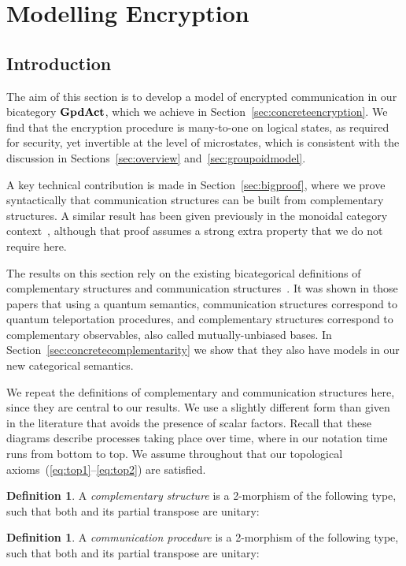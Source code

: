 \documentclass[a4paper,12pt]{article}
\theoremstyle{definition}
\newtheorem{defn}[theorem]{Definition}
\newcommand\cat[1]{{\ensuremath{\bf #1}}}
\renewcommand{\-}[0]{\nobreakdash-\hspace{0pt}}
\begin{document}
\section{Modelling Encryption}
\label{sec:encryption}

\subsection{Introduction}

\noindent
The aim of this section is to develop a model of encrypted communication in our bicategory \cat{GpdAct}, which we achieve in Section~\ref{sec:concreteencryption}. We find that the encryption procedure is many-to-one on logical states, as required for security, yet invertible at the level of microstates, which is consistent with the discussion in Sections~\ref{sec:overview} and~\ref{sec:groupoidmodel}.

A key technical  contribution is made in Section~\ref{sec:bigproof}, where we prove syntactically that communication structures can be built from complementary structures. A similar result has been given previously in the monoidal category context~\cite{cd11-iqo}, although that proof assumes a strong extra property that we do not require here.

The results on this section rely on the existing bicategorical definitions of complementary structures and communication structures~\cite{v12-hqt,v12-hsqp}. It was shown in those papers that using a quantum semantics, communication structures correspond to quantum teleportation procedures, and complementary structures correspond to complementary observables, also called mutually-unbiased bases. In Section~\ref{sec:concretecomplementarity} we show that they also have models in our new categorical semantics.

We repeat the definitions of complementary and communication structures here, since they are central to our results. We use a slightly different form than given in the literature that avoids the presence of scalar factors. Recall that these diagrams describe processes taking place over time, where in our notation time runs from bottom to top. We assume throughout that our topological axioms~(\ref{eq:top1}--\ref{eq:top2}) are satisfied.
\begin{defn}
\label{def:complementarystructure}
A \textit{complementary structure} is a 2\-morphism  of the following type, such that both  and its partial transpose are unitary:


\end{defn}
\begin{defn}
A \textit{communication procedure} is a 2\-morphism  of the following type, such that both  and its partial transpose are unitary:


\end{defn}
\end{document}
